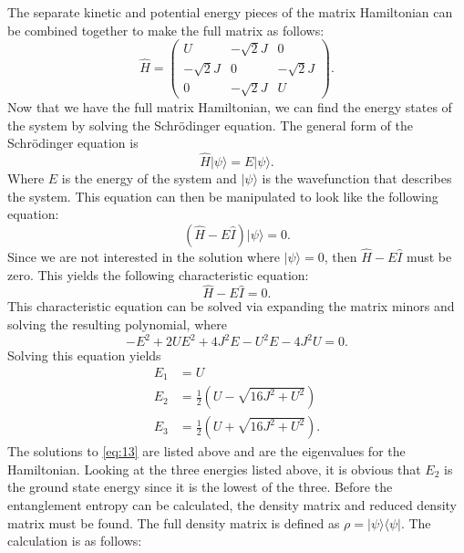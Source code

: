 \noindent The separate kinetic and potential energy pieces of the matrix Hamiltonian can be combined together to make the full matrix as follows:
\begin{equation}
\hat{H} = \begin{pmatrix} U & -\sqrt{2}J & 0 \\ -\sqrt{2}J & 0 & -\sqrt{2}J \\ 0 & -\sqrt{2}J & U \end{pmatrix}.
\end{equation}
\noindent Now that we have the full matrix Hamiltonian, we can find the energy states of the system by solving the Schr\"{o}dinger equation. The general form of the Schr\"{o}dinger equation is
\begin{equation}
\hat{H}|\psi\rangle = E|\psi\rangle.
\end{equation}
\noindent Where $E$ is the energy of the system and $|\psi\rangle$ is the wavefunction that describes the system.
\noindent This equation can then be manipulated to look like the following equation:
\begin{equation}
\left( \hat{H}-E\hat{I} \right) |\psi\rangle = 0.
\end{equation}
\noindent Since we are not interested in the solution where $|\psi\rangle=0$, then $\hat{H}-E\hat{I}$ must be zero. This yields the following characteristic equation:
\begin{equation}
\hat{H}-E\hat{I} = 0.
\end{equation}
\noindent This characteristic equation can be solved via expanding the matrix minors and solving the resulting polynomial, where
\begin{equation}
-E^2 + 2UE^2 + 4J^2E - U^2E - 4J^2U = 0.
\label{eq:13}
\end{equation}
\noindent Solving this equation yields 
\begin{align*}
E_1 &= U \\
E_2 &= \frac{1}{2} \left( U - \sqrt{16J^2 + U^2} \right) \\
E_3 &= \frac{1}{2} \left( U + \sqrt{16J^2 + U^2} \right).
\end{align*}
\noindent The solutions to \cref{eq:13} are listed above and are the eigenvalues for the Hamiltonian.  Looking at the three energies listed above, it is obvious that $E_2$ is the ground state energy since it is the lowest of the three. Before the entanglement entropy can be calculated, the density matrix and reduced density matrix must be found. The full density matrix is defined as $\rho = |\psi \rangle \langle \psi|$. The calculation is as follows:
